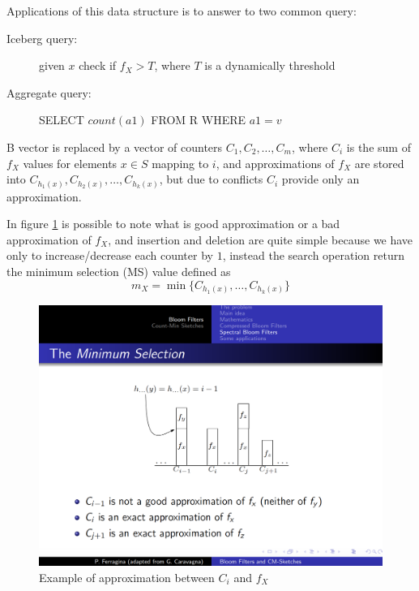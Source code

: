     Applications of this data structure is to answer to two common query:
    \begin{description}
        \item [Iceberg query: ] given $x$ check if $f_X > T$, where $T$ is a dynamically threshold
	\item [Aggregate query: ] SELECT $count(a1)$ FROM R WHERE $a1 = v$
    \end{description}
    B vector is replaced by a vector of counters $C_1, C_2, \dots, C_m$, where $C_i$ is the sum of $f_X$ values for elements $x \in S$ mapping to $i$, and approximations of $f_X$ are stored 
    into $C_{h_1(x)}, C_{h_2(x)}, \dots, C_{h_k(x)}$, but due to conflicts $C_i$ provide only an approximation.

    In figure \ref{img:approximation} is possible to note what is good approximation or a bad approximation of $f_X$, and insertion and deletion are quite simple because we have only
    to increase/decrease each counter by $1$, instead the search operation return the minimum selection (MS) value defined as 
    \[ m_X = \min \{C_{h_1(x)}, \dots, C_{h_k(x)}\} \]

    \begin{figure}
	\caption{Example of approximation between $C_i$ and $f_X$}
	\label{img:approximation}
	\includegraphics[width=\textwidth]{Images/approximation}
    \end{figure}

